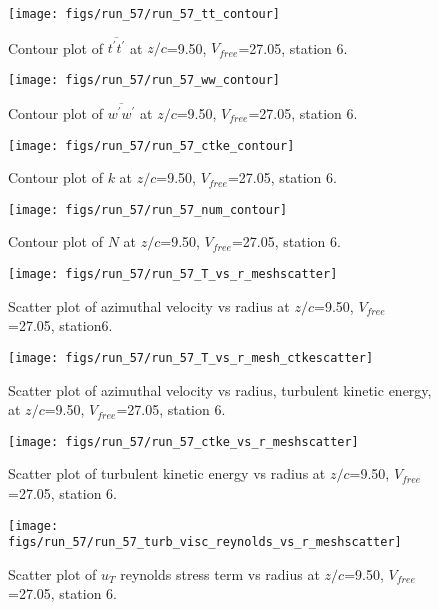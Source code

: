 \begin{figure}[H]
\centering
\texttt{[image: figs/run\_57/run\_57\_tt\_contour]}
\caption{Contour plot of $\overline{t^\prime t^\prime}$ at $z/c$=9.50, $V_{free}$=27.05, station 6.}
\end{figure}


\begin{figure}[H]
\centering
\texttt{[image: figs/run\_57/run\_57\_ww\_contour]}
\caption{Contour plot of $\overline{w^\prime w^\prime}$ at $z/c$=9.50, $V_{free}$=27.05, station 6.}
\end{figure}


\begin{figure}[H]
\centering
\texttt{[image: figs/run\_57/run\_57\_ctke\_contour]}
\caption{Contour plot of $k$ at $z/c$=9.50, $V_{free}$=27.05, station 6.}
\end{figure}


\begin{figure}[H]
\centering
\texttt{[image: figs/run\_57/run\_57\_num\_contour]}
\caption{Contour plot of $N$ at $z/c$=9.50, $V_{free}$=27.05, station 6.}
\end{figure}


\begin{figure}[H]
\centering
\texttt{[image: figs/run\_57/run\_57\_T\_vs\_r\_meshscatter]}
\caption{Scatter plot of azimuthal velocity vs radius at $z/c$=9.50, $V_{free}$=27.05, station6.}
\end{figure}


\begin{figure}[H]
\centering
\texttt{[image: figs/run\_57/run\_57\_T\_vs\_r\_mesh\_ctkescatter]}
\caption{Scatter plot of azimuthal velocity vs radius, turbulent kinetic energy, at $z/c$=9.50, $V_{free}$=27.05, station 6.}
\end{figure}


\begin{figure}[H]
\centering
\texttt{[image: figs/run\_57/run\_57\_ctke\_vs\_r\_meshscatter]}
\caption{Scatter plot of turbulent kinetic energy vs radius at $z/c$=9.50, $V_{free}$=27.05, station 6.}
\end{figure}


\begin{figure}[H]
\centering
\texttt{[image: figs/run\_57/run\_57\_turb\_visc\_reynolds\_vs\_r\_meshscatter]}
\caption{Scatter plot of $
u_T$ reynolds stress term vs radius at $z/c$=9.50, $V_{free}$=27.05, station 6.}
\end{figure}


